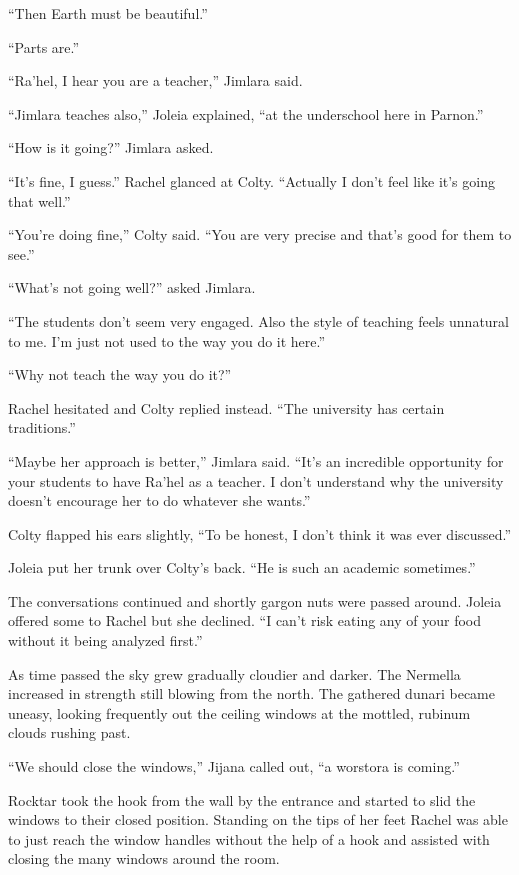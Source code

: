 ``Then Earth must be beautiful.''

``Parts are.''

``Ra'hel, I hear you are a teacher,'' Jimlara said.

``Jimlara teaches also,'' Joleia explained, ``at the underschool here in Parnon.''

``How is it going?'' Jimlara asked.

``It's fine, I guess.'' Rachel glanced at Colty. ``Actually I don't feel like it's going that
well.''

``You're doing fine,'' Colty said. ``You are very precise and that's good for them to see.''

``What's not going well?'' asked Jimlara.

``The students don't seem very engaged. Also the style of teaching feels unnatural to me. I'm
just not used to the way you do it here.''

``Why not teach the way you do it?''

Rachel hesitated and Colty replied instead. ``The university has certain traditions.''

``Maybe her approach is better,'' Jimlara said. ``It's an incredible opportunity for your
students to have Ra'hel as a teacher. I don't understand why the university doesn't encourage
her to do whatever she wants.''

Colty flapped his ears slightly, ``To be honest, I don't think it was ever discussed.''

Joleia put her trunk over Colty's back. ``He is such an academic sometimes.''

The conversations continued and shortly gargon nuts were passed around. Joleia offered some to
Rachel but she declined. ``I can't risk eating any of your food without it being analyzed
first.''

As time passed the sky grew gradually cloudier and darker. The Nermella increased in strength
still blowing from the north. The gathered dunari became uneasy, looking frequently out the
ceiling windows at the mottled, rubinum clouds rushing past.

``We should close the windows,'' Jijana called out, ``a worstora is coming.''

Rocktar took the hook from the wall by the entrance and started to slid the windows to their
closed position. Standing on the tips of her feet Rachel was able to just reach the window
handles without the help of a hook and assisted with closing the many windows around the room.

